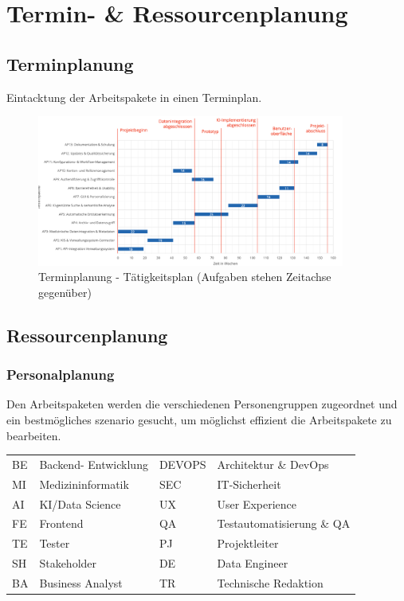 {\let\clearpage\relax
\chapter{Termin- \& Ressourcenplanung}}
\label{sec:terminplanung}

\section{Terminplanung}
Eintacktung der Arbeitspakete in einen Terminplan.
\begin{figure}
	\centering
	\includegraphics[width=0.9\textwidth]{fig/Terminplanung.png}
	\caption{Terminplanung - Tätigkeitsplan (Aufgaben stehen Zeitachse gegenüber)}
	\label{fig:terminplanung}
\end{figure}

\section{Ressourcenplanung}
\subsection{Personalplanung}
Den Arbeitspaketen werden die verschiedenen Personengruppen zugeordnet und ein bestmögliches szenario gesucht, um möglichst effizient die Arbeitspakete zu bearbeiten.
\begin{center}
\begin{tabular}{p{2cm} p{4cm}|p{2cm} p{5cm}}
	BE & Backend- Entwicklung & DEVOPS & Architektur \& DevOps \\
	MI & Medizininformatik & SEC & IT-Sicherheit \\
	AI & KI/Data Science & UX & User Experience \\
	FE & Frontend & QA & Testautomatisierung \& QA \\
	TE & Tester & PJ & Projektleiter \\
	SH & Stakeholder & DE & Data Engineer \\
	BA & Business Analyst & TR & Technische Redaktion
\end{tabular}
\end{center}

